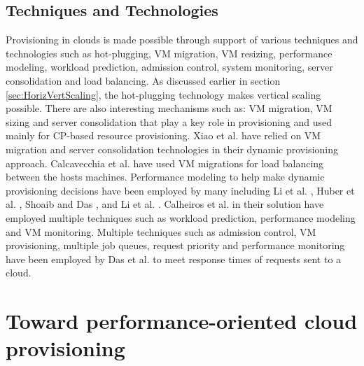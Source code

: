 \documentclass[10pt,journal,cspaper,compsoc]{IEEEtran}
\begin{document}
\subsection{Techniques and Technologies}
\label{subsec:techniquesTechnologies}
Provisioning in clouds is made possible through support of various techniques and technologies such as  hot-plugging, VM migration, VM resizing, performance modeling, workload prediction, admission control, system monitoring, server consolidation and load balancing. As discussed earlier in section \ref{sec:HorizVertScaling}, the hot-plugging technology makes vertical scaling possible. There are also interesting mechanisms such as: VM migration, VM sizing and server consolidation \cite{2012_Mishra_DynamicResourceManagement} that play a key role in provisioning and used mainly for CP-based resource provisioning. Xiao et al. \cite{2013_Xiao_DynResAllocationVM} have relied on VM migration and server consolidation technologies in their dynamic provisioning approach. Calcavecchia et al. \cite{2012_VMPlacementStratCloud} have used VM migrations for load balancing between the hosts machines. Performance modeling to help make dynamic provisioning decisions have been employed by many including Li et al. \cite{jimliwoodside2009performance5}, Huber et al. \cite{huber2011model4}, Shoaib and Das \cite{2012_ucc2012YasDas}, and Li et al. \cite{2011_JimLiCloudOpt}. Calheiros et al. \cite{calheirosvirtual3} in their solution have employed multiple techniques such as workload prediction, performance modeling and VM monitoring. Multiple techniques such as admission control, VM provisioning, multiple job queues, request priority and performance monitoring have been employed by Das et al. \cite{2013_AKDas_IntelligentApproachVMProvisioning} to meet response times of requests sent to a cloud.

\section{Toward performance-oriented cloud provisioning}
\label{sec:TowardPerCloudProv}
\end{document}
